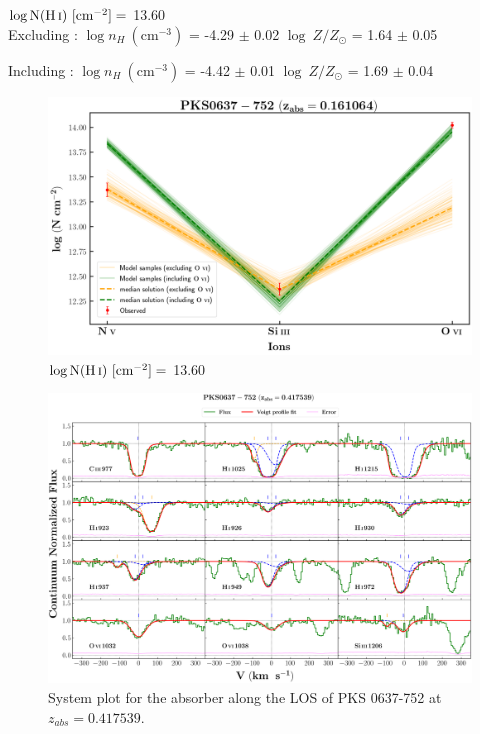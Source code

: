   $\log \text{N}(\ion{H}{i}) \ [\text{cm}^{-2}]=$ 13.60 \\
  
  Excluding  : $\log n_H \ (\text{cm}^{-3})$ = -4.29 $\pm$ 0.02 \hspace{10mm} $\log \ Z/Z_\odot$ = 1.64 $\pm$ 0.05
  
  Including  : $\log n_H \ (\text{cm}^{-3})$ = -4.42 $\pm$ 0.01 \hspace{10mm} $\log \ Z/Z_\odot$ = 1.69 $\pm$ 0.04
  
  
  \begin{figure}[!h]
    \centering
    \includegraphics[width=0.85\linewidth]{Ionisation-Modelling-Plots/pks0637-z=0.161064-compI_logZ=1.png}
    \caption{$\log \text{N}(\ion{H}{i}) \ [\text{cm}^{-2}]=$ 13.60}
  \end{figure}
  
  
  
  \newpage
  
  
  \begin{landscape}
  
      \begin{figure}
      \centering
      \vspace{-20mm}
      \hspace*{-35mm}
      \includegraphics[width=1.25\linewidth]{System-Plots/PKS0637-752_z=0.417539_sys_plot.png}
      \caption{System plot for the absorber along the LOS of PKS 0637-752 at $z_{abs} = 0.417539$. }
      \end{figure}
      
  \end{landscape}
  
